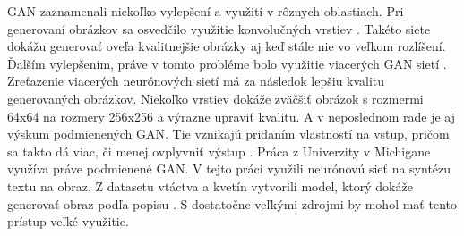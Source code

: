 GAN zaznamenali niekoľko vylepšení a využití v rôznych oblastiach. Pri generovaní obrázkov sa osvedčilo využitie konvolučných vrstiev \cite{DCGAN}.
Takéto siete dokážu generovať oveľa kvalitnejšie obrázky aj keď stále nie vo veľkom rozlíšení.
Ďalším vylepšením, práve v tomto probléme bolo využitie viacerých GAN sietí \cite{stackGAN}. Zreťazenie viacerých neurónových sietí má za následok lepšiu kvalitu generovaných obrázkov.
Niekoľko vrstiev dokáže zväčšiť obrázok s rozmermi 64x64 na rozmery 256x256 a výrazne upraviť kvalitu. A v neposlednom rade je aj výskum podmienených GAN.
Tie vznikajú pridaním vlastností na vstup, pričom sa takto dá viac, či menej ovplyvniť výstup \cite{conGAN}.
Práca z Univerzity v Michigane využíva práve podmienené GAN. V tejto práci využili neurónovú sieť na syntézu textu na obraz.
Z datasetu vtáctva a kvetín vytvorili model, ktorý dokáže generovať obraz podľa popisu \cite{text2image}.
S dostatočne veľkými zdrojmi by mohol mať tento prístup veľké využitie.
